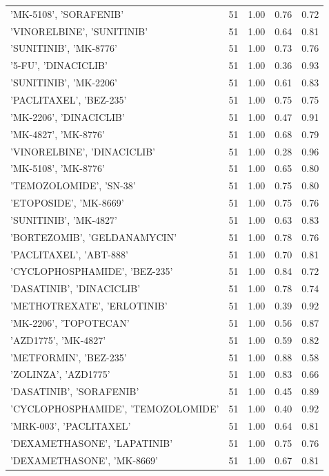 \begin{center}
\begin{longtable}{@{}lcccc@{}}
\bottomrule
\endlastfoot
    'MK-5108', 'SORAFENIB' & 51 & 1.00 & 0.76 & 0.72 \\
    'VINORELBINE', 'SUNITINIB' & 51 & 1.00 & 0.64 & 0.81 \\
    'SUNITINIB', 'MK-8776' & 51 & 1.00 & 0.73 & 0.76 \\
    '5-FU', 'DINACICLIB' & 51 & 1.00 & 0.36 & 0.93 \\
    'SUNITINIB', 'MK-2206' & 51 & 1.00 & 0.61 & 0.83 \\
    'PACLITAXEL', 'BEZ-235' & 51 & 1.00 & 0.75 & 0.75 \\
    'MK-2206', 'DINACICLIB' & 51 & 1.00 & 0.47 & 0.91 \\
    'MK-4827', 'MK-8776' & 51 & 1.00 & 0.68 & 0.79 \\
    'VINORELBINE', 'DINACICLIB' & 51 & 1.00 & 0.28 & 0.96 \\
    'MK-5108', 'MK-8776' & 51 & 1.00 & 0.65 & 0.80 \\
    'TEMOZOLOMIDE', 'SN-38' & 51 & 1.00 & 0.75 & 0.80 \\
    'ETOPOSIDE', 'MK-8669' & 51 & 1.00 & 0.75 & 0.76 \\
    'SUNITINIB', 'MK-4827' & 51 & 1.00 & 0.63 & 0.83 \\
    'BORTEZOMIB', 'GELDANAMYCIN' & 51 & 1.00 & 0.78 & 0.76 \\
    'PACLITAXEL', 'ABT-888' & 51 & 1.00 & 0.70 & 0.81 \\
    'CYCLOPHOSPHAMIDE', 'BEZ-235' & 51 & 1.00 & 0.84 & 0.72 \\
    'DASATINIB', 'DINACICLIB' & 51 & 1.00 & 0.78 & 0.74 \\
    'METHOTREXATE', 'ERLOTINIB' & 51 & 1.00 & 0.39 & 0.92 \\
    'MK-2206', 'TOPOTECAN' & 51 & 1.00 & 0.56 & 0.87 \\
    'AZD1775', 'MK-4827' & 51 & 1.00 & 0.59 & 0.82 \\
    'METFORMIN', 'BEZ-235' & 51 & 1.00 & 0.88 & 0.58 \\
    'ZOLINZA', 'AZD1775' & 51 & 1.00 & 0.83 & 0.66 \\
    'DASATINIB', 'SORAFENIB' & 51 & 1.00 & 0.45 & 0.89 \\
    'CYCLOPHOSPHAMIDE', 'TEMOZOLOMIDE' & 51 & 1.00 & 0.40 & 0.92 \\
    'MRK-003', 'PACLITAXEL' & 51 & 1.00 & 0.64 & 0.81 \\
    'DEXAMETHASONE', 'LAPATINIB' & 51 & 1.00 & 0.75 & 0.76 \\
    'DEXAMETHASONE', 'MK-8669' & 51 & 1.00 & 0.67 & 0.81 \\

\end{longtable}
\end{center}
